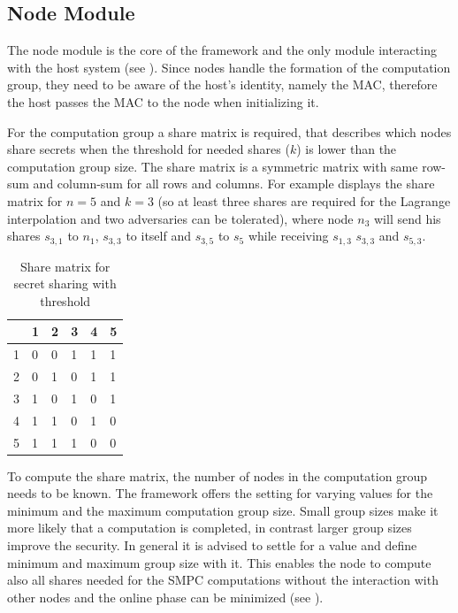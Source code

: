 \subsection{Node Module} \label{Node Module}

The node module is the core of the framework and the only module interacting with the host system (see ). Since nodes handle the formation of the computation group, they need to be aware of the host's identity, namely the \gls{MAC}, therefore the host passes the \gls{MAC} to the node when initializing it.

For the computation group a share matrix is required, that describes which nodes share secrets when the threshold for needed shares ($k$) is lower than the computation group size. The share matrix is a symmetric matrix with same row-sum and column-sum for all rows and columns. For example  displays the share matrix for $n=5$ and $k=3$ (so at least three shares are required for the Lagrange interpolation and two adversaries can be tolerated), where node $n_3$ will send his shares $s_{3,1}$ to $n_1$, $s_{3,3}$ to itself and $s_{3,5}$ to $s_5$ while receiving $s_{1,3}$ $s_{3,3}$ and $s_{5,3}$.
\begin{table}[]
	\centering
	\caption[Share matrix for secret sharing]{Share matrix for secret sharing with threshold}
	\label{Share matrix for secret sharing}
	\begin{tabular}{l|lllll}
		& 1 & 2 & 3 & 4 & 5 \\ \hline
		1 & 0 & 0 & 1 & 1 & 1 \\
		2 & 0 & 1 & 0 & 1 & 1 \\
		3 & 1 & 0 & 1 & 0 & 1 \\
		4 & 1 & 1 & 0 & 1 & 0 \\
		5 & 1 & 1 & 1 & 0 & 0
	\end{tabular}
\end{table}

To compute the share matrix, the number of nodes in the computation group needs to be known. The framework offers the setting for varying values for the minimum and the maximum computation group size. Small group sizes make it more likely that a computation is completed, in contrast larger group sizes improve the security. In general it is advised to settle for a value and define minimum and maximum group size with it. This enables the node to compute also all shares needed for the \gls{SMPC} computations without the interaction with other nodes and the online phase can be minimized (see ).


